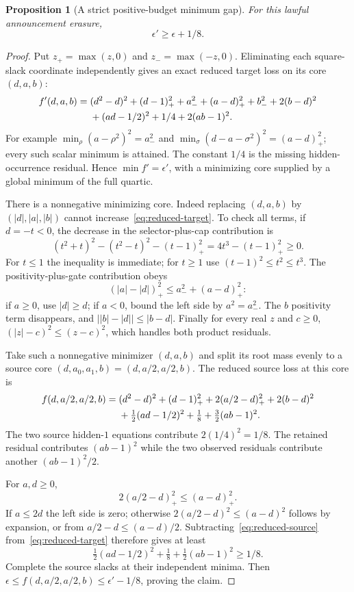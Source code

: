 \documentclass[11pt]{article}
\newtheorem{proposition}[theorem]{Proposition}
\theoremstyle{remark}
\begin{document}
\begin{proposition}[A strict positive-budget minimum gap]\label{prop:erasure-gap}
For this lawful announcement erasure,
\begin{equation}\label{eq:erasure-min-gap}
 \epsilon'\ge\epsilon+1/8.
\end{equation}
\end{proposition}
\begin{proof}
Put $z_+=\max(z,0)$ and $z_-=\max(-z,0)$. Eliminating each square-slack coordinate independently gives an exact reduced target loss on its core $(d,a,b)$:
\begin{align}
 f'(d,a,b)={}&(d^2-d)^2+(d-1)_+^2+a_-^2+(a-d)_+^2+b_-^2
       +2(b-d)^2\notag\\
 &+(ad-1/2)^2+1/4+2(ab-1)^2.\label{eq:reduced-target}
\end{align}
For example $\min_\rho(a-\rho^2)^2=a_-^2$ and
$\min_\sigma(d-a-\sigma^2)^2=(a-d)_+^2$; every such scalar minimum is attained. The constant $1/4$ is the missing hidden-occurrence residual. Hence $\min f'=\epsilon'$, with a minimizing core supplied by a global minimum of the full quartic.

There is a nonnegative minimizing core. Indeed replacing $(d,a,b)$ by $(|d|,|a|,|b|)$ cannot increase~\eqref{eq:reduced-target}. To check all terms, if $d=-t<0$, the decrease in the selector-plus-cap contribution is
\[
 (t^2+t)^2-(t^2-t)^2-(t-1)_+^2
 =4t^3-(t-1)_+^2\ge0.
\]
For $t\le1$ the inequality is immediate; for $t\ge1$ use $(t-1)^2\le t^2\le t^3$. The positivity-plus-gate contribution obeys
\[
 (|a|-|d|)_+^2\le a_-^2+(a-d)_+^2:
\]
if $a\ge0$, use $|d|\ge d$; if $a<0$, bound the left side by $a^2=a_-^2$. The $b$ positivity term disappears, and
$\bigl||b|-|d|\bigr|\le|b-d|$. Finally for every real $z$ and $c\ge0$,
$(|z|-c)^2\le(z-c)^2$, which handles both product residuals.

Take such a nonnegative minimizer $(d,a,b)$ and split its root mass evenly to a source core $(d,a_0,a_1,b)=(d,a/2,a/2,b)$. The reduced source loss at this core is
\begin{align}
 f(d,a/2,a/2,b)={}&(d^2-d)^2+(d-1)_+^2
 +2(a/2-d)_+^2+2(b-d)^2\notag\\
 &+\tfrac12(ad-1/2)^2+\tfrac18
 +\tfrac32(ab-1)^2.\label{eq:reduced-source}
\end{align}
The two source hidden-$1$ equations contribute $2(1/4)^2=1/8$. The retained residual contributes $(ab-1)^2$ while the two observed residuals contribute another $(ab-1)^2/2$.

For $a,d\ge0$,
\[
 2(a/2-d)_+^2\le(a-d)_+^2.
\]
If $a\le2d$ the left side is zero; otherwise $2(a/2-d)^2\le(a-d)^2$ follows by expansion, or from $a/2-d\le(a-d)/2$. Subtracting~\eqref{eq:reduced-source} from~\eqref{eq:reduced-target} therefore gives at least
\[
 \tfrac12(ad-1/2)^2+\tfrac18+\tfrac12(ab-1)^2\ge1/8.
\]
Complete the source slacks at their independent minima. Then
$\epsilon\le f(d,a/2,a/2,b)\le\epsilon'-1/8$, proving the claim.
\end{proof}
\end{document}
